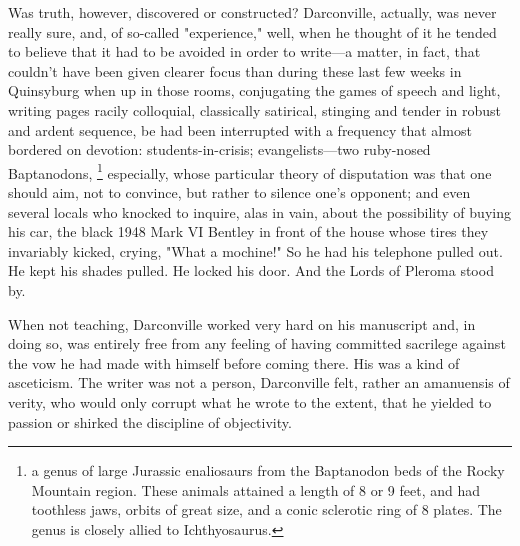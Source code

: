   Was truth, however, discovered or constructed? Darconville, actually, was
never really sure, and, of so-called "experience," well, when he thought of it
he tended to believe that it had to be avoided in order to write---a matter, in
fact, that couldn't have been given clearer focus than during these last few
weeks in Quinsyburg when up in those rooms, conjugating the games of speech and
light, writing pages racily colloquial, classically satirical, stinging and
tender in robust and ardent sequence, be had been interrupted with a frequency
that almost bordered on devotion: students-in-crisis; evangelists---two ruby-nosed
Baptanodons, 
\footnote{ a genus of large Jurassic enaliosaurs from the Baptanodon beds of the
Rocky Mountain region. These animals attained a length of 8 or 9 feet, and had
toothless jaws, orbits of great size, and a conic sclerotic ring of 8 plates.
The genus is closely allied to Ichthyosaurus.
}
especially, whose particular theory of disputation was that one
should aim, not to convince, but rather to silence one's opponent; and even
several locals who knocked to inquire, alas in vain, about the possibility of
buying his car, the black 1948 Mark VI Bentley in front of the house whose tires
they invariably kicked, crying, "What a mochine!" So he had his telephone pulled
out. He kept his shades pulled. He locked his door. And the Lords of Pleroma
stood by.

  When not teaching, Darconville worked very hard on his manuscript and, in
doing so, was entirely free from any feeling of having committed sacrilege
against the vow he had made with himself before coming there. His was a kind of
asceticism. 
The writer was not a person, Darconville felt, rather an amanuensis
of verity, 
who would only corrupt what he wrote to the extent, that he yielded
to passion or shirked the discipline of objectivity.

